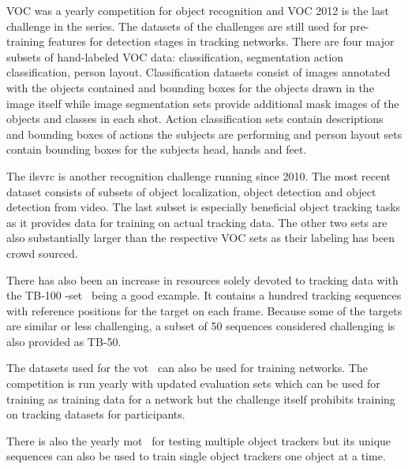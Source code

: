 VOC was a yearly competition for object recognition and VOC 2012 \cite{VOC12} is the last
challenge in the series. The datasets of the challenges are still used for pre-training
features for detection stages in tracking networks. There are four major subsets of
hand-labeled VOC data: classification, segmentation action classification, person layout.
Classification datasets consist of images annotated with the objects contained and bounding
boxes for the objects drawn in the image itself while image segmentation sets provide
additional mask images of the objects and classes in each shot. Action classification sets
contain descriptions and bounding boxes of actions the subjects are performing and person
layout sets contain bounding boxes for the subjects head, hands and feet.

The \ac{ilsvrc} \cite{ILSVRC15} is another recognition challenge running since 2010. The
most recent dataset consists of subsets of object localization, object detection and
object detection from video. The last subset is especially beneficial object tracking
tasks as it provides data for training on actual tracking data. The other two sets are also
substantially larger than the respective VOC sets as their labeling has been crowd sourced.

There has also been an increase in resources solely devoted to tracking data with the
TB-100 -set~\cite{VTB} being a good example. It contains a hundred tracking sequences
with reference positions for the target on each frame. Because some of the targets are
similar or less challenging, a subset of 50 sequences considered challenging is also
provided as TB-50.~\cite{OT_BENCH}

The datasets used for the \ac{vot}~\cite{VOT} can also be used for training networks. The competition
is run yearly with updated evaluation sets which can be used for training as training
data for a network but the challenge itself prohibits training on tracking datasets for
participants.

There is also the yearly \ac{mot}~\cite{MOT16} for testing multiple object trackers but
its unique sequences can also be used to train single object trackers one object at a
time.

